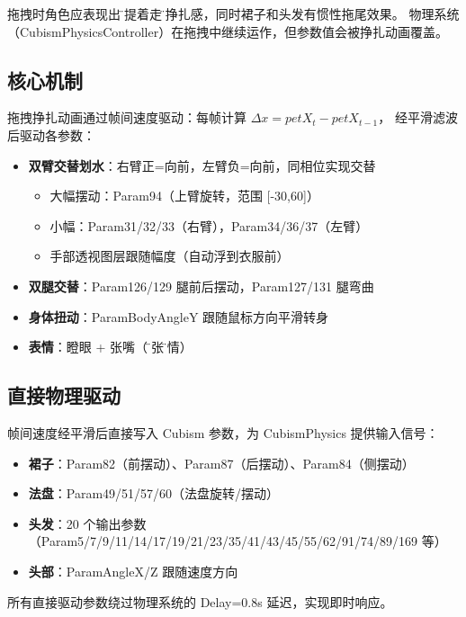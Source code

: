 \documentclass[12pt,a4paper]{ctexart}
\begin{document}
拖拽时角色应表现出\"被提着走\"的挣扎感，同时裙子和头发有惯性拖尾效果。
物理系统（CubismPhysicsController）在拖拽中继续运作，但参数值会被挣扎动画覆盖。

\subsection{核心机制}

拖拽挣扎动画通过帧间速度驱动：每帧计算 $\Delta x = petX_{t} - petX_{t-1}$，
经平滑滤波后驱动各参数：

\begin{itemize}
    \item \textbf{双臂交替划水}：右臂正=向前，左臂负=向前，同相位实现交替
        \begin{itemize}
            \item 大幅摆动：Param94（上臂旋转，范围 [-30,60]）
            \item 小幅：Param31/32/33（右臂），Param34/36/37（左臂）
            \item 手部透视图层跟随幅度（自动浮到衣服前）
        \end{itemize}
    \item \textbf{双腿交替}：Param126/129 腿前后摆动，Param127/131 腿弯曲
    \item \textbf{身体扭动}：ParamBodyAngleY 跟随鼠标方向平滑转身
    \item \textbf{表情}：瞪眼 + 张嘴（\"慌张\"表情）
\end{itemize}

\subsection{直接物理驱动}

帧间速度经平滑后直接写入 Cubism 参数，为 CubismPhysics 提供输入信号：

\begin{itemize}
    \item \textbf{裙子}：Param82（前摆动）、Param87（后摆动）、Param84（侧摆动）
    \item \textbf{法盘}：Param49/51/57/60（法盘旋转/摆动）
    \item \textbf{头发}：20 个输出参数（Param5/7/9/11/14/17/19/21/23/35/41/43/45/55/62/91/74/89/169 等）
    \item \textbf{头部}：ParamAngleX/Z 跟随速度方向
\end{itemize}

所有直接驱动参数绕过物理系统的 Delay=0.8s 延迟，实现即时响应。
\end{document}
